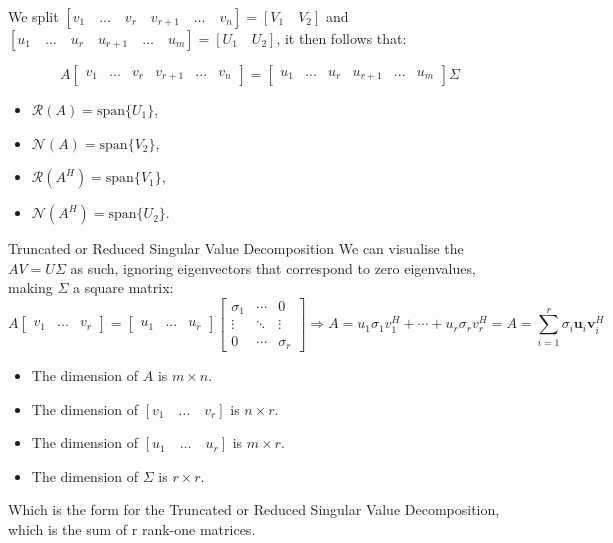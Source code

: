 We split \( [v_1 \quad \ldots \quad v_r \quad v_{r+1} \quad \ldots \quad v_n] = [V_1 \quad V_2] \) and \( [u_1 \quad \ldots \quad u_r \quad u_{r+1} \quad \ldots \quad u_m] = [U_1 \quad U_2] \), it then follows that:

\[A\begin{bmatrix}v_1&...&v_r & v_{r+1} & ...& v_n\end{bmatrix}=\begin{bmatrix}u_1&...&u_r& u_{r+1} & ...& u_m\end{bmatrix}\Sigma\]


\begin{itemize}
    \item \( \mathcal{R}(A) = \text{span}\{U_1\} \),
    \item \( \mathcal{N}(A) = \text{span}\{V_2\} \),
    \item \( \mathcal{R}(A^H) = \text{span}\{V_1\} \),
    \item \( \mathcal{N}(A^H) = \text{span}\{U_2\} \).
\end{itemize}

\begin{definitionbox}{Truncated or Reduced Singular Value Decomposition}
We can visualise the $AV = U\Sigma$ as such, ignoring eigenvectors that correspond to zero eigenvalues, making $\Sigma$ a square matrix:
\[A\begin{bmatrix}v_1&...&v_r\end{bmatrix}=\begin{bmatrix}u_1&...&u_r\end{bmatrix}\begin{bmatrix}\sigma_1&\cdots&0\\\vdots&\ddots&\vdots\\0&\cdots&\sigma_r\end{bmatrix}\Rightarrow A=u_1\sigma_1v_1^H+\cdots+u_r\sigma_rv_r^H = A=\sum_{i=1}^r\sigma_i\boldsymbol{u}_i\boldsymbol{v}_i^H\]

\begin{itemize}
    \item The dimension of \( A \) is \( m \times n \).
    \item The dimension of \( [v_1 \quad \ldots \quad v_r] \) is \( n \times r \).
    \item The dimension of \( [u_1 \quad \ldots \quad u_r] \) is \( m \times r \).
    \item The dimension of \( \Sigma \) is \( r \times r \).
\end{itemize}

Which is the form for the Truncated or Reduced Singular Value Decomposition, which is the sum of r rank-one matrices.

\end{definitionbox}


